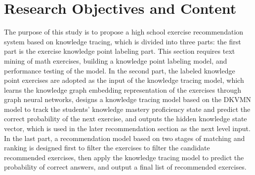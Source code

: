 \section{Research Objectives and Content}  %

The purpose of this study is to propose a high school exercise recommendation system based on knowledge tracing, which is divided into three parts: the first part is the exercise knowledge point labeling part. This section requires text mining of math exercises, building a knowledge point labeling model, and performance testing of the model. In the second part, the labeled knowledge point exercises are adopted as the input of the knowledge tracing model, which learns the knowledge graph embedding representation of the exercises through graph neural networks, designs a knowledge tracing model based on the DKVMN model to track the students' knowledge mastery proficiency state and predict the correct probability of the next exercise, and outputs the hidden knowledge state vector, which is used in the later recommendation section as the next level input. In the last part, a recommendation model based on two stages of matching and ranking is designed first to filter the exercises to filter the candidate recommended exercises, then apply the knowledge tracing model to predict the probability of correct answers, and output a final list of recommended exercises.

